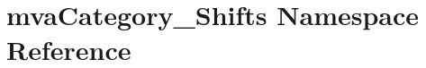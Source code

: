 \hypertarget{namespacemvaCategory__Shifts}{
\section{mvaCategory\_\-Shifts Namespace Reference}
\label{namespacemvaCategory__Shifts}
}
